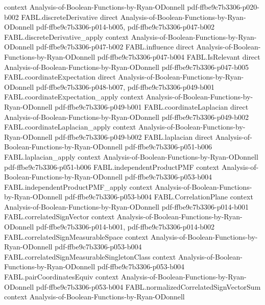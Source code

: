 \begin{theorem}
  {context}
  {Analysis-of-Boolean-Functions-by-Ryan-ODonnell}
  {pdf-ffbe9c7b3306-p020-b002}
\proofstep
  {FABL.discreteDerivative}
  {direct}
  {Analysis-of-Boolean-Functions-by-Ryan-ODonnell}
  {pdf-ffbe9c7b3306-p014-b005,
    pdf-ffbe9c7b3306-p047-b002}
\proofstep
  {FABL.discreteDerivative_apply}
  {context}
  {Analysis-of-Boolean-Functions-by-Ryan-ODonnell}
  {pdf-ffbe9c7b3306-p047-b002}
\proofstep
  {FABL.influence}
  {direct}
  {Analysis-of-Boolean-Functions-by-Ryan-ODonnell}
  {pdf-ffbe9c7b3306-p047-b004}
\proofstep
  {FABL.IsRelevant}
  {direct}
  {Analysis-of-Boolean-Functions-by-Ryan-ODonnell}
  {pdf-ffbe9c7b3306-p047-b005}
\proofstep
  {FABL.coordinateExpectation}
  {direct}
  {Analysis-of-Boolean-Functions-by-Ryan-ODonnell}
  {pdf-ffbe9c7b3306-p048-b007,
    pdf-ffbe9c7b3306-p049-b001}
\proofstep
  {FABL.coordinateExpectation_apply}
  {context}
  {Analysis-of-Boolean-Functions-by-Ryan-ODonnell}
  {pdf-ffbe9c7b3306-p049-b001}
\proofstep
  {FABL.coordinateLaplacian}
  {direct}
  {Analysis-of-Boolean-Functions-by-Ryan-ODonnell}
  {pdf-ffbe9c7b3306-p049-b002}
\proofstep
  {FABL.coordinateLaplacian_apply}
  {context}
  {Analysis-of-Boolean-Functions-by-Ryan-ODonnell}
  {pdf-ffbe9c7b3306-p049-b002}
\proofstep
  {FABL.laplacian}
  {direct}
  {Analysis-of-Boolean-Functions-by-Ryan-ODonnell}
  {pdf-ffbe9c7b3306-p051-b006}
\proofstep
  {FABL.laplacian_apply}
  {context}
  {Analysis-of-Boolean-Functions-by-Ryan-ODonnell}
  {pdf-ffbe9c7b3306-p051-b006}
\proofstep
  {FABL.independentProductPMF}
  {context}
  {Analysis-of-Boolean-Functions-by-Ryan-ODonnell}
  {pdf-ffbe9c7b3306-p053-b004}
\proofstep
  {FABL.independentProductPMF_apply}
  {context}
  {Analysis-of-Boolean-Functions-by-Ryan-ODonnell}
  {pdf-ffbe9c7b3306-p053-b004}
\proofstep
  {FABL.CorrelationPlane}
  {context}
  {Analysis-of-Boolean-Functions-by-Ryan-ODonnell}
  {pdf-ffbe9c7b3306-p014-b001}
\proofstep
  {FABL.correlatedSignVector}
  {context}
  {Analysis-of-Boolean-Functions-by-Ryan-ODonnell}
  {pdf-ffbe9c7b3306-p014-b001,
    pdf-ffbe9c7b3306-p014-b002}
\proofstep
  {FABL.correlatedSignMeasurableSpace}
  {context}
  {Analysis-of-Boolean-Functions-by-Ryan-ODonnell}
  {pdf-ffbe9c7b3306-p053-b004}
\proofstep
  {FABL.correlatedSignMeasurableSingletonClass}
  {context}
  {Analysis-of-Boolean-Functions-by-Ryan-ODonnell}
  {pdf-ffbe9c7b3306-p053-b004}
\proofstep
  {FABL.pairCoordinatesEquiv}
  {context}
  {Analysis-of-Boolean-Functions-by-Ryan-ODonnell}
  {pdf-ffbe9c7b3306-p053-b004}
\proofstep
  {FABL.normalizedCorrelatedSignVectorSum}
  {context}
  {Analysis-of-Boolean-Functions-by-Ryan-ODonnell}

\end{theorem}
